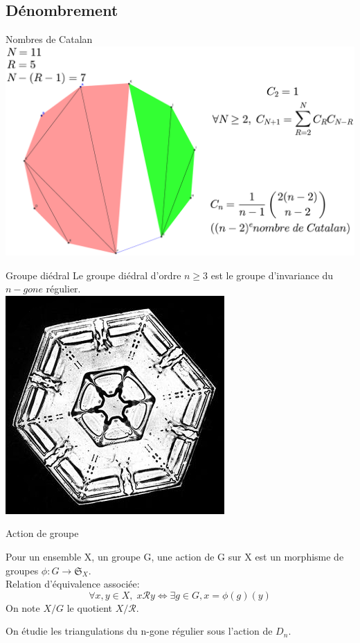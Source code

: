 \documentclass[french,xcolor=dvipsnames]{beamer}
\begin{document}
		\subsection{Dénombrement}
		\begin{frame}{Nombres de Catalan}
			\includegraphics[scale=0.15]{nombres_catalan.eps}
		\end{frame}
		\begin{frame}{Groupe diédral}
			Le groupe diédral d'ordre $n\geqslant 3$ est le groupe d'invariance du $n-gone$ régulier.\\
			\includegraphics[scale=0.22]{snowflake.jpg}
		\end{frame}
		
		\begin{frame}{Action de groupe}
			\begin{definition}
			Pour un ensemble X, un groupe G, une action de G sur X est un morphisme de groupes
			$\phi: G \rightarrow \mathfrak{S}_{X}$.\\
			Relation d'équivalence associée:
			\[
				\forall x,y \in X,\; x \mathcal{R} y \Leftrightarrow \exists g \in G, x=\phi(g)(y)
			\]
			On note $X/G$ le quotient $X/\mathcal{R}$.
			\end{definition}
			
			On étudie les triangulations du n-gone régulier sous l'action de $D_{n}$.
		\end{frame}
		
\end{document}
